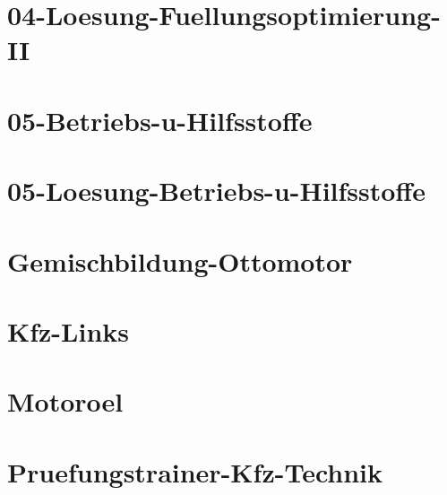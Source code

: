 \chapter{04-Loesung-Fuellungsoptimierung-II}
%
\chapter{05-Betriebs-u-Hilfsstoffe}
%
\chapter{05-Loesung-Betriebs-u-Hilfsstoffe}
%
\chapter{Gemischbildung-Ottomotor}
%
\chapter{Kfz-Links}
%
\chapter{Motoroel}
%
\chapter{Pruefungstrainer-Kfz-Technik}
%



%
%



%

